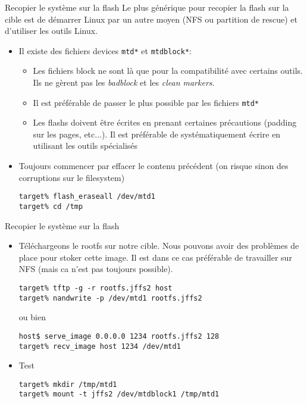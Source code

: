 \begin{frame}[fragile=singleslide]{Recopier le système sur la flash}
  Le  plus  générique pour  recopier  la flash  sur  la  cible est  de
  démarrer Linux par un autre moyen  (NFS ou partition de rescue) et 
  d'utiliser les outils Linux.
  \begin{itemize} 
  \item    Il   existe   des    fichiers   devices    \verb+mtd*+   et
    \verb+mtdblock*+:
    \begin{itemize} 
    \item Les fichiers block ne sont là que pour la compatibilité avec
      certains outils.  Ils ne gèrent  pas les \emph{badblock}  et les
      \emph{clean markers}.
    \item  Il  est préférable  de  passer  le  plus possible  par  les
      fichiers \verb+mtd*+
    \item  Les  flashs  doivent   être  écrites  en  prenant  certaines
      précautions (padding  sur les pages, etc...).  Il est préférable
      de systématiquement écrire en utilisant les outils spécialisés
    \end{itemize} 
  \item Toujours commencer par effacer le contenu précédent (on risque
    sinon des corruptions sur le filesystem)
    \begin{lstlisting}
target% flash_eraseall /dev/mtd1
target% cd /tmp
    \end{lstlisting}
  \end{itemize}
\end{frame}

\begin{frame}[fragile=singleslide]{Recopier le système sur la flash}
  \begin{itemize} 
  \item Téléchargeons  le rootfs sur  notre cible. Nous  pouvons avoir
    des problèmes  de place pour stoker  cette image.  Il  est dans ce
    cas préférable de  travailler sur NFS (mais ca  n'est pas toujours
    possible).
    \begin{lstlisting} 
target% tftp -g -r rootfs.jffs2 host
target% nandwrite -p /dev/mtd1 rootfs.jffs2
    \end{lstlisting}
    ou bien
    \begin{lstlisting} 
host$ serve_image 0.0.0.0 1234 rootfs.jffs2 128
target% recv_image host 1234 /dev/mtd1
    \end{lstlisting} 
  \item  Test
    \begin{lstlisting}
target% mkdir /tmp/mtd1
target% mount -t jffs2 /dev/mtdblock1 /tmp/mtd1
    \end{lstlisting} 
  \end{itemize}
\end{frame}


